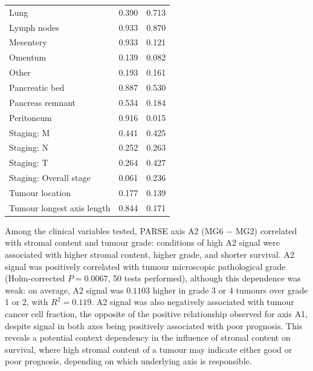 \documentclass[dissertation.tex]{subfiles}
\begin{document}
\begin{table}[h]
\begin{tabular}{@{}lll@{}}
\quad Lung                 & 0.390                         & 0.713                         \\
\quad Lymph nodes          & 0.933                         & 0.870                         \\
\quad Mesentery            & 0.933                         & 0.121                         \\
\quad Omentum              & 0.139                         & 0.082                         \\
\quad Other                & 0.193                         & 0.161                         \\
\quad Pancreatic bed       & 0.887                         & 0.530                         \\
\quad Pancreas remnant     & 0.534                         & 0.184                         \\
\quad Peritoneum           & 0.916                         & 0.015                         \\
Staging: M                 & 0.441                         & 0.425                         \\
Staging: N                 & 0.252                         & 0.263                         \\
Staging: T                 & 0.264                         & 0.427                         \\
Staging: Overall stage     & 0.061                         & 0.236                         \\
Tumour location            & 0.177                         & 0.139                         \\
Tumour longest axis length & 0.844                         & 0.171                         \\ \bottomrule
\end{tabular}
\end{table}

Among the clinical variables tested, \gls{PARSE} axis A2 (MG6 $-$ MG2) correlated with stromal content and tumour grade: conditions of high A2 signal were associated with higher stromal content, higher grade, and shorter survival.  A2 signal was positively correlated with tumour microscopic pathological grade (Holm-corrected $P = 0.0067$, 50 tests performed), although this dependence was weak: on average, A2 signal was $0.1103$ higher in grade 3 or 4 tumours over grade 1 or 2, with $R^2 = 0.119$.   A2 signal was also negatively associated with tumour cancer cell fraction, the opposite of the positive relationship observed for axis A1, despite signal in both axes being positively associated with poor prognosis.  This reveals a potential context dependency in the influence of stromal content on survival, where high stromal content of a tumour may indicate either good or poor prognosis, depending on which underlying axis is responsible.
\end{document}
